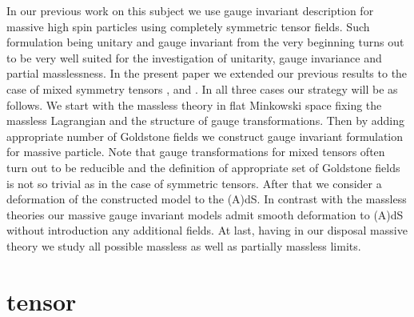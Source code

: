 \documentclass[a4paper,12pt]{article}
\begin{document}
In our previous work on this subject \cite{Zin01}  we use gauge invariant
description for massive high spin particles using completely symmetric
tensor fields. Such formulation being unitary and gauge invariant from
the very beginning turns out to be very well suited for the investigation of
unitarity, gauge invariance and partial masslessness. In the present
paper we extended our previous results to the case of mixed symmetry
tensors \myHighlight{$\Phi_{[\mu\nu],\alpha}$}\coordHE{}, \coordHE{} and
\coordHE{}. In all three cases our strategy will be
as follows. We start with the massless theory in flat Minkowski space
fixing the massless Lagrangian and the structure of gauge transformations.
Then by adding appropriate number of Goldstone fields we construct gauge
invariant formulation for massive particle. Note that gauge transformations
for mixed tensors often turn out to be reducible and the definition of
appropriate set of Goldstone fields is not so trivial as in the case of
symmetric tensors. After that we consider a deformation of the constructed
model to the (A)dS. In contrast with the massless theories our massive
gauge invariant models admit smooth deformation to (A)dS without
introduction any additional fields. At last, having in our disposal massive
theory we study all possible massless as well as partially massless
limits.

\section{\myHighlight{$\Phi_{[\mu\nu],\alpha}$}\coordHE{} tensor}
\end{document}
